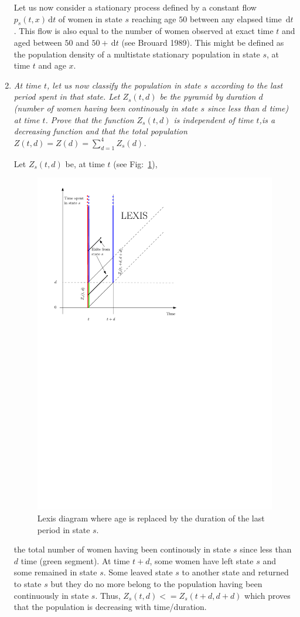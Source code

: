 \documentclass[11pt,letterpaper]{article}
\def\D{{\,\mathrm d}}
\def\D{{\,\mathrm d}}
\begin{document}
\begin{enumerate}
  Let us now consider a stationary process defined by a constant flow
  $p_s(t,x) \D t$ of women in state $s$ reaching age $50$ between any
  elapsed time $\D t$.  This flow is also equal to the number of women
  observed at exact time $t$ and aged between $50$ and $50+\D t$ (see
  Brouard 1989). This might be defined as the population density of a
  multistate stationary population in state $s$, at time $t$ and age
  $x$.


  
  
\item \emph{At time $t$, let us now classify the population in state $s$ according to the
     last period spent in that state. Let $Z_s(t,d)$ be the pyramid
    by duration $d$ (number of women having been continously in state
    $s$ since less than $d$ time) at time $t$. Prove that the function
    $Z_s(t,d)$ is independent of time $t$,is a decreasing function
    and that the total population $Z(t,d)=Z(d)=\sum_{d=1}^4 Z_s(d)$.}


  Let $Z_s(t,d)$ be, at time $t$ (see Fig:~\ref{f:exercise-multistate-lexis-ipe}),
 \begin{figure}[htbp]\centering
   \includegraphics[width=.5\textwidth]{exercise-multistate-lexis-ipe}
   \caption{\sf Lexis diagram where age is replaced by the duration of
     the last period in state
     $s$. }\label{f:exercise-multistate-lexis-ipe}
 \end{figure}
 the total number of women having
  been continously in state $s$ since less than $d$ time (green segment). At time
  $t+d$, some women have left state $s$ and some remained in
  state $s$. Some leaved state $s$ to another state and returned to
  state $s$ but they do no more belong to the population having been
  continuously in state $s$. Thus,
  $Z_s(t,d) <= Z_s(t+d,d+d)$ which proves that the population
  is decreasing with time/duration.


\end{enumerate}
\end{document}
